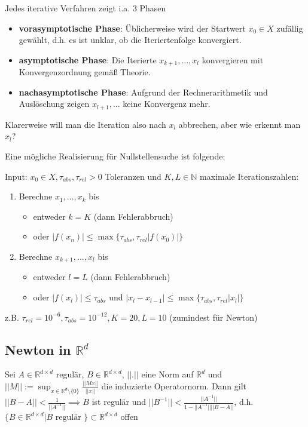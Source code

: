 \begin{remark}
	Jedes iterative Verfahren zeigt i.a. 3 Phasen
	\begin{itemize}
		\item \textbf{vorasymptotische Phase}: Üblicherweise wird der Startwert $x_0 \in X$ zufällig gewählt, d.h. es ist unklar, ob die Iteriertenfolge konvergiert.
		\item \textbf{asymptotische Phase}: Die Iterierte $x_{k+1}, ..., x_l$ konvergieren mit Konvergenzordnung gemäß Theorie.
		\item \textbf{nachasymptotische Phase}: Aufgrund der Rechnerarithmetik und Auslöschung zeigen $x_{l+1}, ...$ keine Konvergenz mehr.
	\end{itemize}
	Klarerweise will man die Iteration also nach $x_l$ abbrechen, aber wie erkennt man $x_l$?
	
	Eine mögliche Realisierung für Nullstellensuche ist folgende:
	
	Input: $x_0 \in X, \tau_{abs}, \tau_{rel} > 0$ Toleranzen und $K,L \in \mathbb{N}$ maximale Iterationszahlen:
	\begin{enumerate}
		\item Berechne $x_1, ..., x_k$ bis
		\begin{itemize}
			\item entweder $k=K$ (dann Fehlerabbruch)
			\item oder $|f(x_n)| \leq \max\{\tau_{abs}, \tau_{rel}|f(x_0)|\}$
		\end{itemize}
		\item Berechne $x_{k+1}, ..., x_{l}$ bis
		\begin{itemize}
			\item entweder $l=L$ (dann Fehlerabbruch)
			\item oder $|f(x_l)| \leq \tau_{abs}$ und $|x_l - x_{l-1}| \leq \max\{\tau_{abs}, \tau_{rel}|x_l|\}$
		\end{itemize}
	\end{enumerate}
	
	z.B. $\tau_{rel} = 10^{-6}, \tau_{abs} = 10^{-12}, K=20, L=10$ (zumindest für Newton)
\end{remark}

\subsection{Newton in $\mathbb{R}^d$}

\begin{lemma}
	Sei $A \in \mathbb{R}^{d\times d}$ regulär, $B \in \mathbb{R}^{d\times d}$, $||.||$ eine Norm auf $\mathbb{R}^d$ und $||M|| := \sup_{x \in \mathbb{R}^d \setminus \{0\}} \frac{||Mx||}{||x||}$ die induzierte Operatornorm. Dann gilt $||B-A|| < \frac{1}{||A^{-1}||} \implies B$ ist regulär und $||B^{-1}|| < \frac{||A^{-1}||}{1- ||A^{-1}|| ||B-A||}$, d.h. $\{B \in \mathbb{R}^{d\times d} | B \text{ regulär }\} \subset \mathbb{R}^{d\times d}$ offen
\end{lemma}

